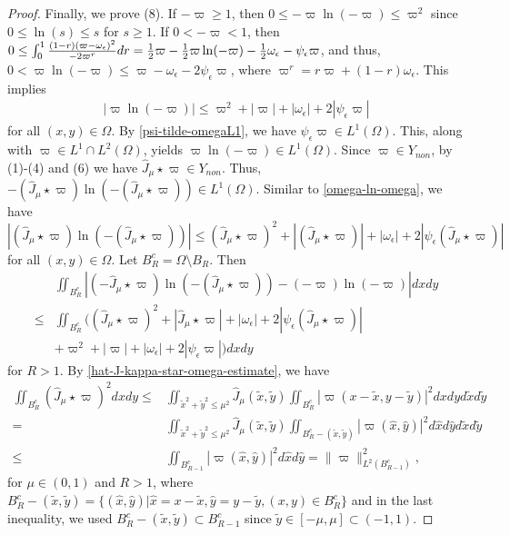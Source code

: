 \documentclass[1 [leqno, 11pt]{amsart}
\numberwithin{equation}{section}
\let\ep=\epsilon
\begin{document}
\begin{CJK*}{GBK}{song}
\begin{appendix}
\begin{proof}
Finally, we prove (8).
If $-\varpi\geq1$, then $0\leq-\varpi\ln(-\varpi)\leq \varpi^2$ since $0\leq\ln (s)\leq s$ for $s\geq1$. If $0<-\varpi<1$, then $0\leq \int_0^1{(1-r)(\varpi-\omega_\ep)^2\over -2\varpi^r}dr={1\over2}\varpi-{1\over2}\varpi\ln(-\varpi)-{1\over2}\omega_\ep-\psi_\ep\varpi$, and thus, $0<\varpi\ln(-\varpi)\leq \varpi-\omega_\ep-2\psi_\ep\varpi$, where $\varpi^r=r\varpi+(1-r)\omega_\ep$.  This implies
\begin{align}\label{omega-ln-omega}|\varpi\ln(-\varpi)|\leq \varpi^2+|\varpi|+|\omega_\ep|+2|\psi_\ep\varpi|
\end{align}
for all $(x,y)\in\Omega$. By \eqref{psi-tilde-omegaL1}, we have $\psi_\ep\varpi\in L^1(\Omega)$. This, along with $\varpi\in L^1\cap L^2(\Omega)$, yields $\varpi\ln(-\varpi)\in L^1(\Omega)$.
Since $\varpi\in Y_{non}$, by  (1)-(4) and (6) we have $\hat J_{\mu}\star\varpi\in Y_{non}$. Thus,
$-(\hat J_{\mu}\star\varpi)\ln(-(\hat J_{\mu}\star\varpi))\in L^1(\Omega)$. Similar to \eqref{omega-ln-omega}, we have $|(\hat J_{\mu}\star\varpi)\ln(-(\hat J_{\mu}\star\varpi))|\leq (\hat J_{\mu}\star\varpi)^2+|(\hat J_{\mu}\star\varpi)|+|\omega_\ep|+2|\psi_\ep(\hat J_{\mu}\star\varpi)|$ for all $(x,y)\in\Omega$.
Let $B_R^c=\Omega\setminus B_R$. Then
\begin{align}\nonumber
&\iint_{B_R^c}|(-\hat J_{\mu}\star\varpi)\ln(-(\hat J_{\mu}\star\varpi))-(-\varpi)\ln(-\varpi)|dxdy\\\nonumber
\leq&
\iint_{B_R^c}\bigg((\hat J_{\mu}\star\varpi)^2+|\hat J_{\mu}\star\varpi|+|\omega_\ep|+2|\psi_\ep(\hat J_{\mu}\star\varpi)|\\\label{BRc1}
&+\varpi^2+|\varpi|+|\omega_\ep|+2|\psi_\ep\varpi|\bigg)dxdy
\end{align}
for $R>1$. By \eqref{hat-J-kappa-star-omega-estimate}, we have
\begin{align}\nonumber
\iint_{B_R^c}(\hat J_{\mu}\star\varpi)^2dxdy\leq &\iint_{\tilde x^2+\tilde y^2\leq \mu^2}\hat J_{\mu}(\tilde x,\tilde y)\iint_{B_R^c}|\varpi(x-\tilde x,y-\tilde y)|^2dxdyd\tilde x d\tilde y\\\nonumber
=&\iint_{\tilde x^2+\tilde y^2\leq \mu^2}\hat J_{\mu}(\tilde x,\tilde y)\iint_{B_R^c-(\tilde x,\tilde y)}|\varpi(\hat x,\hat y)|^2d\hat xd\hat yd\tilde x d\tilde y\\\label{BRc2}
\leq& \iint_{B_{R-1}^c}|\varpi(\hat x,\hat y)|^2d\hat xd\hat y=\|\varpi\|_{L^2(B_{R-1}^c)}^2,
\end{align}
 for $\mu\in(0,1)$ and $R>1$,
where $ B_R^c-(\tilde x,\tilde y)=\{(\hat x,\hat y)|\hat x=x-\tilde x,\hat y=y-\tilde y, (x,y)\in B_R^c\}$ and in the last inequality, we used $B_R^c-(\tilde x,\tilde y)\subset B_{R-1}^c$ since $\tilde y\in[-\mu,\mu]\subset (-1,1)$.

\end{proof}
\end{appendix}
\end{CJK*}
\end{document}
